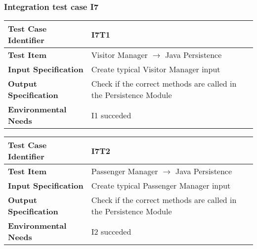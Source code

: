 \subsubsection{Integration test case I7}

\begin{table}[!htbp]
\begin{center}
\begin{tabular}[t]{p{}p{}}

\hline
\textbf{Test Case Identifier} & I7T1 \\
\hline
\textbf{Test Item} & Visitor Manager $\rightarrow$ Java Persistence \\
\hline
\textbf{Input Specification} & Create typical Visitor Manager input  \\
\hline
\textbf{Output Specification} & Check if the correct methods are called in the Persistence Module \\
\hline
\textbf{Environmental Needs} & I1 succeded \\
\hline

\end{tabular}
\end{center}
\end{table}

\begin{table}[!htbp]
\begin{center}
\begin{tabular}[t]{p{}p{}}

\hline
\textbf{Test Case Identifier} & I7T2 \\
\hline
\textbf{Test Item} & Passenger Manager $\rightarrow$ Java Persistence \\
\hline
\textbf{Input Specification} & Create typical Passenger Manager input \\
\hline
\textbf{Output Specification} & Check if the correct methods are called in the Persistence Module \\
\hline
\textbf{Environmental Needs} & I2 succeded \\
\hline

\end{tabular}
\end{center}
\end{table}

